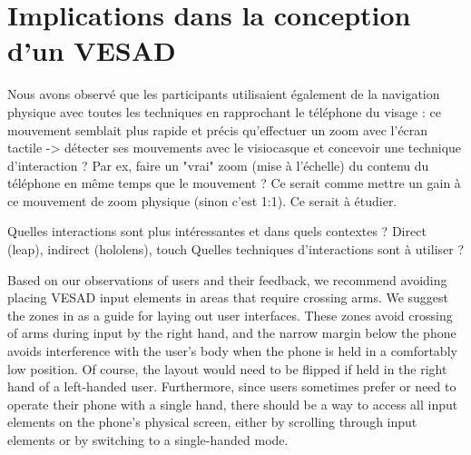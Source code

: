 


\section{Implications dans la conception d'un VESAD}
\label{sec:discussion_consequences}

Nous avons observé que les participants utilisaient également de la navigation physique avec toutes les techniques en rapprochant le téléphone du visage : ce mouvement semblait plus rapide et précis qu'effectuer un zoom avec l'écran tactile -> détecter ses mouvements avec le visiocasque et concevoir une technique d'interaction ? Par ex, faire un "vrai" zoom (mise à l'échelle) du contenu du téléphone en même temps que le mouvement ? Ce serait comme mettre un gain à ce mouvement de zoom physique (sinon c'est 1:1). Ce serait à étudier.

Quelles interactions sont plus intéressantes et dans quels contextes ? Direct (leap), indirect (hololens), touch
Quelles techniques d'interactions sont à utiliser ?

Based on our observations of users and their feedback, we recommend avoiding placing VESAD input elements in areas that require crossing arms. We suggest the zones in  as a guide for laying out user interfaces. These zones avoid crossing of arms during input by the right hand, and the narrow margin below the phone avoids interference with the user's body when the phone is held in a comfortably low position. Of course, the layout would need to be flipped if held in the right hand of a left-handed user. Furthermore, since users sometimes prefer or need to operate their phone with a single hand, there should be a way to access all input elements on the phone's physical screen, either by scrolling through input elements or by switching to a single-handed mode.



